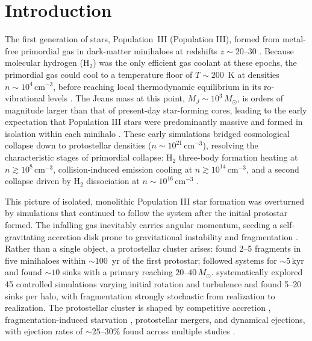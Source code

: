 \documentclass[twocolumn]{openjournal}
\newcommand{\Msun}{M_\odot}
\newcommand{\kyr}{\,\mathrm{kyr}}
\begin{document}
\section{Introduction}
\label{sec:intro}

The first generation of stars, Population~III (Population III), formed from
metal-free primordial gas in dark-matter minihaloes at redshifts
$z \sim 20$--$30$ \citep{abel02, bromm02}.
Because molecular hydrogen (H$_2$) was the only efficient gas coolant
at these epochs, the primordial gas could cool to a temperature floor of
$T \sim 200$~K at densities $n \sim 10^4\,\mathrm{cm}^{-3}$, before
reaching local thermodynamic equilibrium in its ro-vibrational levels
\citep{bromm02, klessen_glover23}.
The Jeans mass at this point, $M_J \sim 10^3\,\Msun$, is orders of
magnitude larger than that of present-day star-forming cores, leading
to the early expectation that Population III stars were predominantly massive
and formed in isolation within each minihalo
\citep{abel02, bromm02, yoshida08}.
These early simulations bridged cosmological collapse down to
protostellar densities ($n \sim 10^{21}\,\mathrm{cm}^{-3}$), resolving
the characteristic stages of primordial collapse: H$_2$ three-body
formation heating at $n \gtrsim 10^8\,\mathrm{cm}^{-3}$,
collision-induced emission cooling at $n \gtrsim 10^{14}\,\mathrm{cm}^{-3}$,
and a second collapse driven by H$_2$ dissociation at
$n \sim 10^{16}\,\mathrm{cm}^{-3}$ \citep{yoshida08, wollenberg20}.

This picture of isolated, monolithic Population III star formation was
overturned by simulations that continued to follow the system
after the initial protostar formed.
The infalling gas inevitably carries angular momentum, seeding a
self-gravitating accretion disk prone to gravitational instability and
fragmentation \citep{stacy10, clark11, greif11}.
Rather than a single object, a protostellar cluster arises:
\citet{greif11} found 2--5 fragments in five minihaloes within
$\sim 100$~yr of the first protostar; \citet{stacy10, stacy12} followed
systems for $\sim 5\kyr$ and found $\sim 10$ sinks with a primary
reaching $20$--$40\,\Msun$.
\citet{wollenberg20} systematically explored 45 controlled simulations
varying initial rotation and turbulence and found 5--20 sinks per halo,
with fragmentation strongly stochastic from realization to realization.
The protostellar cluster is shaped by competitive accretion
\citep{bonnell01}, fragmentation-induced starvation
\citep{wollenberg20}, protostellar mergers, and dynamical ejections,
with ejection rates of $\sim 25$--$30\%$ found across multiple studies
\citep{greif11, stacy12, wollenberg20}.
\end{document}
